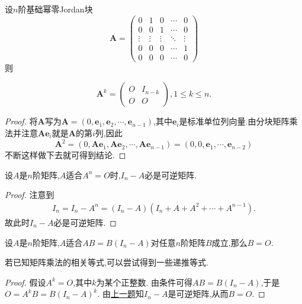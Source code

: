 \documentclass[../../main.tex]{subfiles}
\begin{document}
\begin{proposition}[基础幂零Jordan块]\label{proposition:基础幂零Jordan块}
设\(n\)阶基础幂零Jordan块
\[
\boldsymbol{A}=\left(\begin{array}{ccccc}
0 & 1 & 0 & \cdots & 0 \\
0 & 0 & 1 & \cdots & 0 \\
\vdots & \vdots & \vdots & \ddots & \vdots \\
0 & 0 & 0 & \cdots & 1 \\
0 & 0 & 0 & \cdots & 0
\end{array}\right)
\]
则

\[
\boldsymbol{A}^{k}=\left(\begin{array}{cc}
O & I_{n - k} \\
O & O
\end{array}\right),1 \leq k \leq n.
\]
\end{proposition}
\begin{proof}
将\(\boldsymbol{A}\)写为\(\boldsymbol{A}=(0,\mathbf{e}_{1},\mathbf{e}_{2},\cdots,\mathbf{e}_{n - 1})\),其中\(\mathbf{e}_{i}\)是标准单位列向量.由分块矩阵乘法并注意\(\boldsymbol{A}\mathbf{e}_{i}\)就是\(\boldsymbol{A}\)的第\(i\)列,因此
\[
\boldsymbol{A}^{2}=(0,\boldsymbol{A}\mathbf{e}_{1},\boldsymbol{A}\mathbf{e}_{2},\cdots,\boldsymbol{A}\mathbf{e}_{n - 1})=(0,0,\mathbf{e}_{1},\cdots,\mathbf{e}_{n - 2})
\]
不断这样做下去就可得到结论.
\end{proof}

\begin{example}\label{example:56471456}
设\(A\)是\(n\)阶矩阵,\(A\)适合\(A^n = O\)时,\(I_n - A\)必是可逆矩阵.
\end{example}
\begin{proof}
注意到
\begin{align*}
I_n=I_n-A^n=\left( I_n-A \right) \left( I_n+A+A^2+\cdots +A^{n-1} \right) .
\end{align*}
故此时\(I_n - A\)必是可逆矩阵.
\end{proof}

\begin{example}
设\(A\)是\(n\)阶矩阵,\(A\)适合\(AB = B(I_n - A)\)对任意\(n\)阶矩阵\(B\)成立,那么\(B = O\).
\end{example}
\begin{note}
若已知矩阵乘法的相关等式,可以尝试得到一些递推等式.
\end{note}
\begin{proof}
假设\(A^k = O\),其中\(k\)为某个正整数. 由条件可得\(AB = B(I_n - A)\),于是\(O = A^kB = B(I_n - A)^k\). 由\hyperref[example:56471456]{上一题}知\(I_n - A\)是可逆矩阵,从而\(B = O\).
\end{proof}
\end{document}
